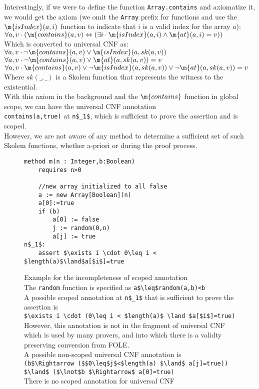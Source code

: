 Interestingly, if we were to define the function \lstinline|Array.contains| and axiomatize it, we would get the axiom (we omit the \lstinline|Array| prefix for functions and use the $\m{isIndex}(a,i)$ function to indicate that $i$ is a valid index for the array $a$):\\
$\forall a, v \cdot (\m{contains}(a,v) \Leftrightarrow (\exists i \cdot \m{isIndex}(a,i) \land \m{at}(a,i)=v))$\\
Which is converted to universal CNF as:\\
$\forall a, v \cdot \lnot \m{contains}(a,v) \lor  \m{isIndex}(a,sk(a,v))$\\
$\forall a, v \cdot \lnot \m{contains}(a,v) \lor  \m{at}(a,sk(a,v))=v$\\
$\forall a, v \cdot \m{contains}(a,v) \lor  \lnot \m{isIndex}(a,sk(a,v)) \lor \lnot \m{at}(a,sk(a,v))=v$\\
Where $sk(\_,\_)$ is a Skolem function that represents the witness to the existential.\\
With this axiom in the background and the $\m{contains}$ function in global scope, we can have the universal CNF annotation\\
\lstinline|contains(a,true)| at \lstinline|n$_1$|, which is sufficient to prove the assertion and is scoped.\\
However, we are not aware of any method to determine a sufficient set of such Skolem functions, whether a-priori or during the proof process.




\begin{figure}
\begin{lstlisting}
method m(n : Integer,b:Boolean)
	requires n>0
	
	//new array initialized to all false
	a := new Array[Boolean](n)
	a[0]:=true
	if (b)
		a[0] := false
		j := random(0,n)
		a[j] := true
n$_1$:
	assert $\exists i \cdot 0\leq i < $length(a)$\land$a[$i$]=true
\end{lstlisting}
\caption{Example for the incompleteness of scoped annotation\\
The \lstinline|random| function is specified as \lstinline|a$\leq$random(a,b)<b|\\
A possible scoped annotation at \lstinline|n$_1$| that is sufficient to prove the assertion is \\
\lstinline|$\exists i \cdot (0\leq i < $length(a)$ \land $a[$i$]=true)|\\
However, this annotation is not in the fragment of universal CNF which is used by many provers, and into which there is a validty preserving conversion from FOLE.\\
A possible non-scoped universal CNF annotation is\\
\indent\lstinline|(b$\Rightarrow ($$0\leq$j$<$length(a) $\land$ a[j]=true)) $\land$ ($\lnot$b $\Rightarrow$ a[0]=true)|\\
There is no scoped annotation for universal CNF
}
\label{snippet_1.4}
\end{figure}

